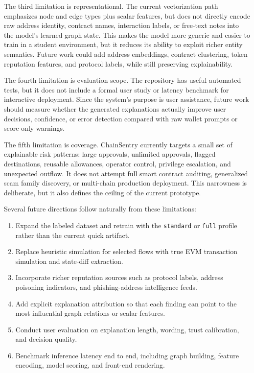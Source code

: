 \documentclass[11pt]{article}
\begin{document}
The third limitation is representational. The current vectorization path emphasizes node and edge types plus scalar features, but does not directly encode raw address identity, contract names, interaction labels, or free-text notes into the model's learned graph state. This makes the model more generic and easier to train in a student environment, but it reduces its ability to exploit richer entity semantics. Future work could add address embeddings, contract clustering, token reputation features, and protocol labels, while still preserving explainability.

The fourth limitation is evaluation scope. The repository has useful automated tests, but it does not include a formal user study or latency benchmark for interactive deployment. Since the system's purpose is user assistance, future work should measure whether the generated explanations actually improve user decisions, confidence, or error detection compared with raw wallet prompts or score-only warnings.

The fifth limitation is coverage. ChainSentry currently targets a small set of explainable risk patterns: large approvals, unlimited approvals, flagged destinations, reusable allowances, operator control, privilege escalation, and unexpected outflow. It does not attempt full smart contract auditing, generalized scam family discovery, or multi-chain production deployment. This narrowness is deliberate, but it also defines the ceiling of the current prototype.

Several future directions follow naturally from these limitations:

\begin{enumerate}[leftmargin=2em]
    \item Expand the labeled dataset and retrain with the \texttt{standard} or \texttt{full} profile rather than the current quick artifact.
    \item Replace heuristic simulation for selected flows with true EVM transaction simulation and state-diff extraction.
    \item Incorporate richer reputation sources such as protocol labels, address poisoning indicators, and phishing-address intelligence feeds.
    \item Add explicit explanation attribution so that each finding can point to the most influential graph relations or scalar features.
    \item Conduct user evaluation on explanation length, wording, trust calibration, and decision quality.
    \item Benchmark inference latency end to end, including graph building, feature encoding, model scoring, and front-end rendering.
\end{enumerate}
\end{document}
